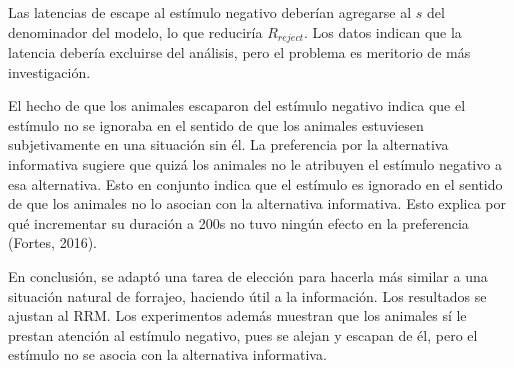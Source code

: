 \documentclass[a4paper,12pt]{article}
\begin{document}
Las latencias de escape al estímulo negativo deberían agregarse al $s$ del denominador del modelo, lo que reduciría $R_{reject}$. Los datos indican que la latencia debería excluirse del análisis, pero el problema es meritorio de más investigación.

El hecho de que los animales escaparon del estímulo negativo indica que el estímulo no se ignoraba en el sentido de que los animales estuviesen subjetivamente en una situación sin él. La preferencia por la alternativa informativa sugiere que quizá los animales no le atribuyen el estímulo negativo a esa alternativa. Esto en conjunto indica que el estímulo es ignorado en el sentido de que los animales no lo asocian con la alternativa informativa. Esto explica por qué incrementar su duración a 200s no tuvo ningún efecto en la preferencia (Fortes, 2016).

En conclusión, se adaptó una tarea de elección para hacerla más similar a una situación natural de forrajeo, haciendo útil a la información. Los resultados se ajustan al RRM. Los experimentos además muestran que los animales sí le prestan atención al estímulo negativo, pues se alejan y escapan de él, pero el estímulo no se asocia con la alternativa informativa.
\end{document}
